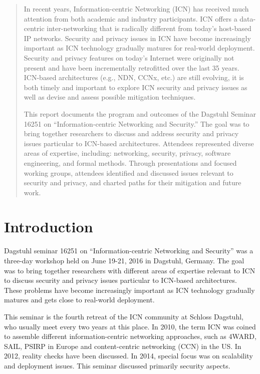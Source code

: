 \documentclass{sig-alternate-10pt}
\makeatletter
\renewcommand{\paragraph}[1]{\vspace*{0.03in}\noindent{\bf #1.}\hspace{0.25ex \@plus1ex \@minus.2ex}}
\makeatother
\begin{document}
\begin{abstract}
In recent years, Information-centric Networking (ICN) has received much attention from
both academic and industry participants. ICN offers a data-centric inter-networking
that is radically different from today's host-based IP networks. Security and privacy issues
in ICN have become increasingly important as ICN technology gradually matures for
real-world deployment. Security and privacy features on today's Internet
were originally not present and have been incrementally retrofitted
over the last 35 years. ICN-based architectures
(e.g., NDN, CCNx, etc.) are still evolving, it is both timely and important to explore
ICN security and privacy issues as well as devise and assess possible mitigation techniques.

This report documents the program and outcomes of the Dagstuhl Seminar 16251
on ``Information-centric Networking and Security.'' The goal was to bring together
researchers to discuss and address security and privacy issues particular to ICN-based
architectures. Attendees represented diverse areas of expertise, including: networking,
security, privacy, software engineering, and formal methods. Through presentations and
focused working groups, attendees identified and discussed issues relevant to security
and privacy, and charted paths for their mitigation and future work.
\end{abstract}

\section{Introduction}
Dagstuhl seminar 16251 on ``Information-centric Networking and Security'' was a three-day
workshop held on June 19-21, 2016 in Dagstuhl, Germany. The goal was to bring together researchers with
different areas of expertise relevant to ICN to discuss security and privacy issues
particular to ICN-based architectures. These problems have become increasingly
important as ICN technology gradually matures and gets close to real-world deployment.

\paragraph{Brief History of Dagstuhl Seminars on ICN}
This seminar is the fourth retreat of the ICN community at Schloss Dagstuhl, who
usually meet every two years at this place. In 2010, the term ICN was
coined to assemble different informa\-tion-centric networking approaches,
such as 4WARD, SAIL, PSIRP in Europe and content-centric networking (CCN) in the US.
In 2012, reality checks have been discussed. In 2014, special focus was on scalability
and deployment issues. This seminar discussed primarily security aspects.
\end{document}

